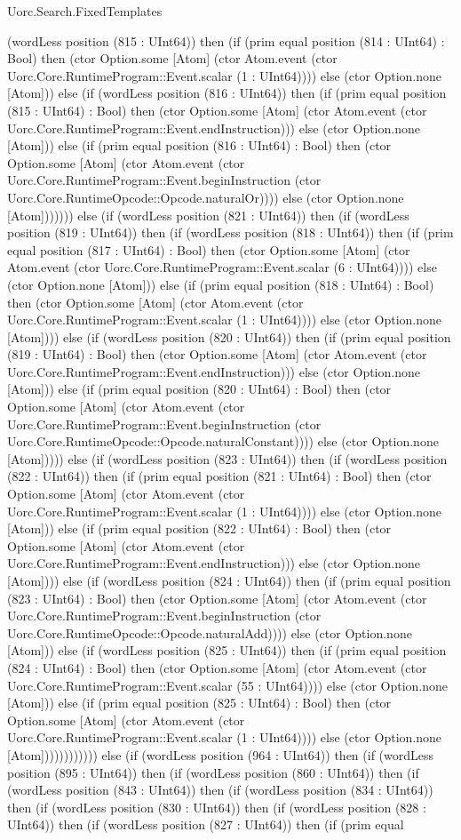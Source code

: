 \begin{lexlean}{Uorc.Search.FixedTemplates}
\begin{semanticmodule}
{(wordLess position (815 : UInt64)) then (if (prim equal position (814 : UInt64) : Bool) then (ctor Option.some [Atom] (ctor Atom.event (ctor Uorc.Core.RuntimeProgram::Event.scalar (1 : UInt64)))) else (ctor Option.none [Atom])) else (if (wordLess position (816 : UInt64)) then (if (prim equal position (815 : UInt64) : Bool) then (ctor Option.some [Atom] (ctor Atom.event (ctor Uorc.Core.RuntimeProgram::Event.endInstruction))) else (ctor Option.none [Atom])) else (if (prim equal position (816 : UInt64) : Bool) then (ctor Option.some [Atom] (ctor Atom.event (ctor Uorc.Core.RuntimeProgram::Event.beginInstruction (ctor Uorc.Core.RuntimeOpcode::Opcode.naturalOr)))) else (ctor Option.none [Atom])))))) else (if (wordLess position (821 : UInt64)) then (if (wordLess position (819 : UInt64)) then (if (wordLess position (818 : UInt64)) then (if (prim equal position (817 : UInt64) : Bool) then (ctor Option.some [Atom] (ctor Atom.event (ctor Uorc.Core.RuntimeProgram::Event.scalar (6 : UInt64)))) else (ctor Option.none [Atom])) else (if (prim equal position (818 : UInt64) : Bool) then (ctor Option.some [Atom] (ctor Atom.event (ctor Uorc.Core.RuntimeProgram::Event.scalar (1 : UInt64)))) else (ctor Option.none [Atom]))) else (if (wordLess position (820 : UInt64)) then (if (prim equal position (819 : UInt64) : Bool) then (ctor Option.some [Atom] (ctor Atom.event (ctor Uorc.Core.RuntimeProgram::Event.endInstruction))) else (ctor Option.none [Atom])) else (if (prim equal position (820 : UInt64) : Bool) then (ctor Option.some [Atom] (ctor Atom.event (ctor Uorc.Core.RuntimeProgram::Event.beginInstruction (ctor Uorc.Core.RuntimeOpcode::Opcode.naturalConstant)))) else (ctor Option.none [Atom])))) else (if (wordLess position (823 : UInt64)) then (if (wordLess position (822 : UInt64)) then (if (prim equal position (821 : UInt64) : Bool) then (ctor Option.some [Atom] (ctor Atom.event (ctor Uorc.Core.RuntimeProgram::Event.scalar (1 : UInt64)))) else (ctor Option.none [Atom])) else (if (prim equal position (822 : UInt64) : Bool) then (ctor Option.some [Atom] (ctor Atom.event (ctor Uorc.Core.RuntimeProgram::Event.endInstruction))) else (ctor Option.none [Atom]))) else (if (wordLess position (824 : UInt64)) then (if (prim equal position (823 : UInt64) : Bool) then (ctor Option.some [Atom] (ctor Atom.event (ctor Uorc.Core.RuntimeProgram::Event.beginInstruction (ctor Uorc.Core.RuntimeOpcode::Opcode.naturalAdd)))) else (ctor Option.none [Atom])) else (if (wordLess position (825 : UInt64)) then (if (prim equal position (824 : UInt64) : Bool) then (ctor Option.some [Atom] (ctor Atom.event (ctor Uorc.Core.RuntimeProgram::Event.scalar (55 : UInt64)))) else (ctor Option.none [Atom])) else (if (prim equal position (825 : UInt64) : Bool) then (ctor Option.some [Atom] (ctor Atom.event (ctor Uorc.Core.RuntimeProgram::Event.scalar (1 : UInt64)))) else (ctor Option.none [Atom]))))))))))) else (if (wordLess position (964 : UInt64)) then (if (wordLess position (895 : UInt64)) then (if (wordLess position (860 : UInt64)) then (if (wordLess position (843 : UInt64)) then (if (wordLess position (834 : UInt64)) then (if (wordLess position (830 : UInt64)) then (if (wordLess position (828 : UInt64)) then (if (wordLess position (827 : UInt64)) then (if (prim equal }
\end{semanticmodule}
\end{lexlean}
